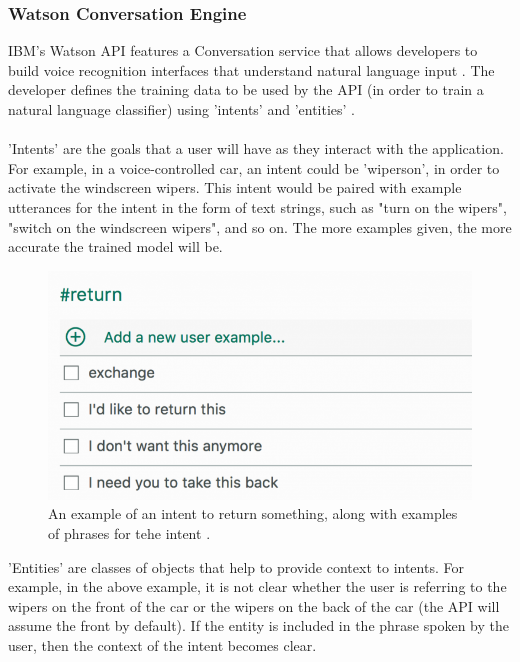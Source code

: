 \documentclass[12pt]{article}
\begin{document}
\subsubsection{Watson Conversation Engine}

IBM's Watson API features a Conversation service that allows developers to build voice recognition interfaces that understand natural language input \cite{RefWorks:27}. The developer defines the training data to be used by the API (in order to train a natural language classifier) using 'intents' and 'entities' \cite{RefWorks:31}.
\\
\\
'Intents' are the goals that a user will have as they interact with the application. For example, in a voice-controlled car, an intent could be 'wipers\textunderscore on', in order to activate the windscreen wipers. This intent would be paired with example utterances for the intent in the form of text strings, such as "turn on the wipers", "switch on the windscreen wipers", and so on. The more examples given, the more accurate the trained model will be.
\begin{center}
\begin{figure}[H]
  \includegraphics[width=\textwidth]{intent-return.png}
  \caption{An example of an intent to return something, along with examples of phrases for tehe intent \cite{RefWorks:34}.}
\end{figure}
\end{center}
'Entities' are classes of objects that help to provide context to intents. For example, in the above example, it is not clear whether the user is referring to the wipers on the front of the car or the wipers on the back of the car (the API will assume the front by default). If the entity is included in the phrase spoken by the user, then the context of the intent becomes clear.
\end{document}
